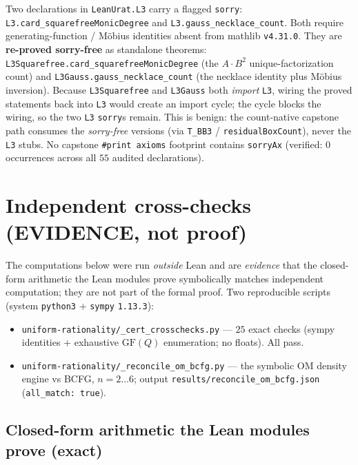 \documentclass[11pt]{article}
\newcommand{\code}[1]{\texttt{#1}}
\begin{document}
Two declarations in \code{LeanUrat.L3} carry a flagged \code{sorry}:
\code{L3.card\_squarefreeMonicDegree} and \code{L3.gauss\_necklace\_count}. Both require
generating-function / M\"obius identities absent from \textsf{mathlib} \code{v4.31.0}.
They are \textbf{re-proved sorry-free} as standalone theorems:
\code{L3Squarefree.card\_squarefreeMonicDegree} (the $A\cdot B^2$ unique-factorization
count) and \code{L3Gauss.gauss\_necklace\_count} (the necklace identity plus M\"obius
inversion). Because \code{L3Squarefree} and \code{L3Gauss} both \emph{import} \code{L3},
wiring the proved statements back into \code{L3} would create an import cycle; the cycle
blocks the wiring, so the two \code{L3} \code{sorry}s remain. This is benign: the
count-native capstone path consumes the \emph{sorry-free} versions (via \code{T\_BB3} /
\code{residualBoxCount}), never the \code{L3} stubs. No capstone \code{\#print axioms}
footprint contains \code{sorryAx} (verified: $0$ occurrences across all $55$ audited
declarations).

\section{Independent cross-checks (EVIDENCE, not proof)}\label{sec:crosschecks}

The computations below were run \emph{outside} Lean and are \emph{evidence} that the
closed-form arithmetic the Lean modules prove symbolically matches independent
computation; they are not part of the formal proof. Two reproducible scripts (system
\code{python3} + \code{sympy} \code{1.13.3}):
\begin{itemize}[leftmargin=1.4em]
\item \code{uniform-rationality/\_cert\_crosschecks.py} --- $25$ exact checks
(sympy identities + exhaustive $\mathrm{GF}(Q)$ enumeration; no floats). All pass.
\item \code{uniform-rationality/\_reconcile\_om\_bcfg.py} --- the symbolic OM density
engine vs BCFG, $n=2{\dots}6$; output \code{results/reconcile\_om\_bcfg.json}
(\code{all\_match: true}).
\end{itemize}

\subsection{Closed-form arithmetic the Lean modules prove (exact)}
\end{document}
